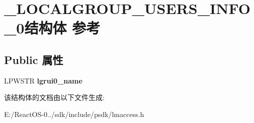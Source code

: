 \hypertarget{struct___l_o_c_a_l_g_r_o_u_p___u_s_e_r_s___i_n_f_o__0}{}\section{\+\_\+\+L\+O\+C\+A\+L\+G\+R\+O\+U\+P\+\_\+\+U\+S\+E\+R\+S\+\_\+\+I\+N\+F\+O\+\_\+0结构体 参考}
\label{struct___l_o_c_a_l_g_r_o_u_p___u_s_e_r_s___i_n_f_o__0}
\subsection*{Public 属性}
\begin{DoxyCompactItemize}
\item 
\mbox{\label{struct___l_o_c_a_l_g_r_o_u_p___u_s_e_r_s___i_n_f_o__0_a0677a5bee8dabd25c39601ee447f95b1}} 
L\+P\+W\+S\+TR {\bfseries lgrui0\+\_\+name}
\end{DoxyCompactItemize}


该结构体的文档由以下文件生成\+:\begin{DoxyCompactItemize}
\item 
E\+:/\+React\+O\+S-\/0../sdk/include/psdk/lmaccess.\+h\end{DoxyCompactItemize}
